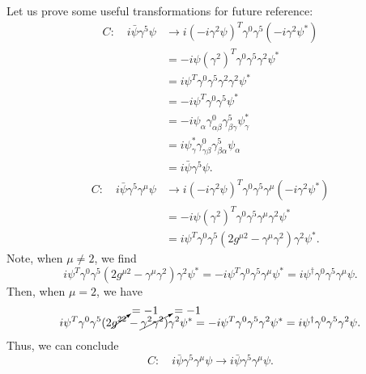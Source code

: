 \documentclass[11pt]{article}
\theoremstyle{definition}
\begin{document}
\begin{tcolorbox}[breakable, colback=yellow!20!white, colframe=black, boxrule=1pt]
Let us prove some useful transformations for future reference:
\begin{equation}
    \begin{aligned}
        C: \quad i\bar{\psi}\gamma^5\psi &\rightarrow i(-i\gamma^2\psi)^T\gamma^0\gamma^5(-i\gamma^2\psi^*)\\
        &= -i\psi(\gamma^2)^T\gamma^0\gamma^5\gamma^2\psi^*\\
        &= i\psi^T\gamma^0\gamma^5\gamma^2\gamma^2\psi^*\\
        &= -i\psi^T\gamma^0\gamma^5\psi^*\\
        &= -i\psi_{\alpha}\gamma^0_{\alpha\beta}\gamma^5_{\beta\gamma}\psi^*_\gamma\\
        &= i\psi_{\gamma}^*\gamma^0_{\gamma\beta}\gamma^5_{\beta\alpha}\psi_\alpha\\
        &= i\bar{\psi}\gamma^5\psi.
    \end{aligned}
\end{equation}
\begin{equation}
    \begin{aligned}
        C: \quad i\bar{\psi}\gamma^5\gamma^\mu\psi &\rightarrow i(-i\gamma^2\psi)^T\gamma^0\gamma^5\gamma^\mu(-i\gamma^2\psi^*)\\
        &= -i\psi(\gamma^2)^T\gamma^0\gamma^5\gamma^\mu\gamma^2\psi^*\\
        &= i\psi^T\gamma^0\gamma^5(2g^{\mu2} - \gamma^\mu\gamma^2)\gamma^2\psi^*.
    \end{aligned}
\end{equation}
Note, when $\mu \neq 2$, we find
\begin{equation}
    i\psi^T\gamma^0\gamma^5(2g^{\mu2} - \gamma^\mu\gamma^2)\gamma^2\psi^* = -i\psi^T\gamma^0\gamma^5\gamma^\mu\psi^* = i\psi^\dagger\gamma^0\gamma^5\gamma^\mu\psi.
\end{equation}
Then, when $\mu =2$, we have
\begin{equation}
    i\psi^T\gamma^0\gamma^5(2\cancelto{=-1}{g^{22}} - \cancelto{=-1}{\gamma^2\gamma^2)}\gamma^2\psi^* = -i\psi^T\gamma^0\gamma^5\gamma^2\psi^* = i\psi^\dagger\gamma^0\gamma^5\gamma^2\psi.
\end{equation}
Thus, we can conclude
\begin{equation}
    C: \quad i\bar{\psi}\gamma^5\gamma^\mu\psi \rightarrow i\bar{\psi}\gamma^5\gamma^\mu\psi.
    \label{Eq. gamma deriv 1}
\end{equation}

\end{tcolorbox}
\end{document}
